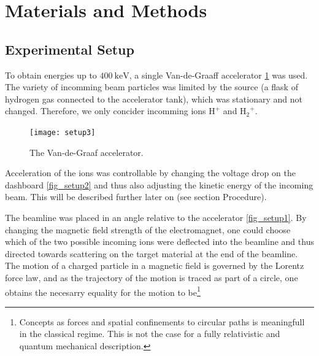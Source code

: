 \section{Materials and Methods}
\subsection{Experimental Setup}
To obtain energies up to $\SI{400}{\kilo\electronvolt}$, a single
Van-de-Graaff accelerator \cref{fig_setup3} was used. The variety of incomming
beam particles was limited by the source (a flask of hydrogen gas connected to
the accelerator tank), which was stationary and not changed. Therefore, we only
concider incomming ions $\mathrm{H^+}$ and $\mathrm{{H_2}^{+}}$. 
%
\begin{figure}[t]
    \centering
    \texttt{[image: setup3]}
    \caption{The Van-de-Graaf accelerator.}
    \label{fig_setup3}
\end{figure}
%
Acceleration of the ions was controllable by changing the voltage drop on the
dashboard \cref{fig_setup2} and thus also adjusting the kinetic energy of the
incoming beam. This will be described further later on (see section Procedure).

The beamline was placed in an angle relative to the accelerator
\cref{fig_setup1}. By changing the magnetic field strength of the
electromagnet, one could choose which of the two possible incoming ions were
deflected into the beamline and thus directed towards scattering on the target material at the end of the beamline. 
The motion of a charged particle in a magnetic field is governed by the Lorentz
force law, and as the trajectory of the motion is traced as part of a circle,
one obtains the necesarry equality for the motion to be\footnote{Concepts as
forces and spatial confinements to circular paths is meaningfull in the
classical regime. This is not the case for a fully relativistic and quantum
mechanical description.}

